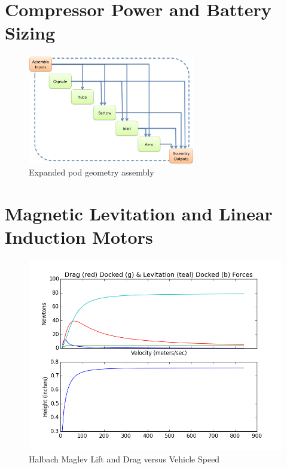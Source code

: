 \documentclass[heading.tex]{subfiles}
\begin{document}
\section{Compressor Power and Battery Sizing}

\begin{figure}[hbtp]
\centering
\includegraphics[width=0.65\textwidth]{images/podAssembly.png}
\caption{Expanded pod geometry assembly}
\label{f:podXDSM}
\end{figure}

\section{Magnetic Levitation and Linear Induction Motors}

\begin{figure}[hbtp]
\centering
\includegraphics[width=.75\textwidth]{images/halbach0.png}
 \caption[h0]{Halbach Maglev Lift and Drag versus Vehicle Speed}
\label{f:h0}
\end{figure}
\end{document}

